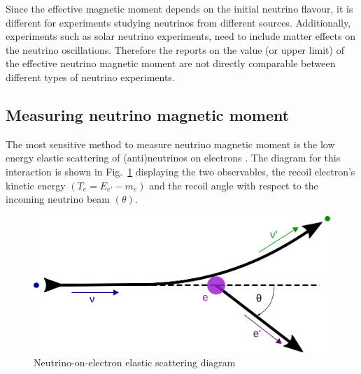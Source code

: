 Since the effective magnetic moment depends on the initial neutrino flavour, it is different for experiments studying neutrinos from different sources. Additionally, experiments such as solar neutrino experiments, need to include matter effects on the neutrino oscillations. Therefore the reports on the value (or upper limit) of the effective neutrino magnetic moment are not directly comparable between different types of neutrino experiments.


\subsection{Measuring neutrino magnetic moment}\label{sec:MeasuringNuMM}
The most sensitive method to measure neutrino magnetic moment is the low energy elastic scattering of (anti)neutrinos on electrons \cite{nuElmagInt2015.pdf}. The diagram for this interaction is shown in Fig.~\ref{fig:NuoneDiagram} displaying the two observables, the recoil electron's kinetic energy $\left(T_e=E_{e\prime}-m_e\right)$ and the recoil angle with respect to the incoming neutrino beam $\left(\theta\right)$.
\begin{figure}[hbtp]
\centering
\includegraphics[width=0.55\linewidth]{Plots/NuMM/NuoneInteraction.png}
\caption{Neutrino-on-electron elastic scattering diagram}
\label{fig:NuoneDiagram}
\end{figure}

